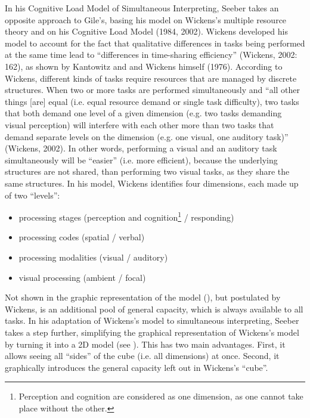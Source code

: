 \documentclass[output=paper]{langsci/langscibook}
\begin{document}
In his Cognitive Load Model of Simultaneous Interpreting, Seeber takes an opposite approach to Gile’s, basing his model on Wickens’s multiple resource theory and on his Cognitive Load Model (1984, 2002). Wickens developed his model to account for the fact that qualitative differences in tasks being performed at the same time lead to “differences in time-sharing efficiency” (Wickens, 2002: 162), as shown by Kantowitz and \citet{Knight1976} and Wickens himself (1976). According to Wickens, different kinds of tasks require resources that are managed by discrete structures. When two or more tasks are performed simultaneously and “all other things [are] equal (i.e. equal resource demand or single task difficulty), two tasks that both demand one level of a given dimension (e.g. two tasks demanding visual perception) will interfere with each other more than two tasks that demand separate levels on the dimension (e.g. one visual, one auditory task)” (Wickens, 2002). In other words, performing a visual and an auditory task simultaneously will be “easier” (i.e. more efficient), because the underlying structures are not shared, than performing two visual tasks, as they share the same structures. In his model, Wickens identifies four dimensions, each made up of two “levels”:

\begin{itemize}
\item processing stages (perception and cognition\footnote{Perception and cognition are considered as one dimension, as one cannot take place without the other.} / responding)
\item processing codes (spatial / verbal)
\item processing modalities (visual / auditory)
\item visual processing (ambient / focal)
\end{itemize}

Not shown in the graphic representation of the model (), but postulated by Wickens, is an additional pool of general capacity, which is always available to all tasks. In his adaptation of Wickens’s model to simultaneous interpreting, Seeber takes a step further, simplifying the graphical representation of Wickens’s model by turning it into a 2D model (see ). This has two main advantages. First, it allows seeing all “sides” of the cube (i.e. all dimensions) at once. Second, it graphically introduces the general capacity left out in Wickens’s “cube”. 

 
\end{document}
